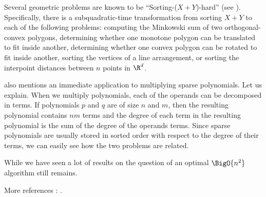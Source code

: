 Several geometric problems are known to be ``Sorting-($X + Y$)-hard'' (see
\citet*{barrera1996finding,barequet2001polygon}). Specifically, there
is a subquadratic-time transformation from sorting $X + Y$ to each of the
following problems: computing the Minkowski sum of two orthogonal-convex
polygons, determining whether one monotone polygon can be translated to fit
inside another, determining whether one convex polygon can be rotated to fit
inside another, sorting the vertices of a line arrangement, or sorting the
interpoint distances between $n$ points in $\R^d$.

\citet{fredman:1976} also mentions an immediate application to multiplying sparse
polynomials. Let us explain. When we multiply
polynomials, each of the operands can be decomposed in terms. If polynomials
$p$ and $q$ are of size $n$ and $m$, then the resulting polynomial contains
$nm$ terms and the degree of each term in the resulting polynomial is the sum
of the degree of the operands terms. Since sparse polynomials are usually
stored in sorted order with respect to the degree of their terms, we can easily
see how the two problems are related.

While we have seen a lot of results on  the question of an
optimal $\BigO{n^2}$ algorithm still remains.

More references : \citet*{
orourke:2012:sortxy,
kahn:1995,
dietzfelbinger1989lower,
steiger1995pseudo,
lambert:1990,
erickson:1999,
bremner2012necklaces}.



